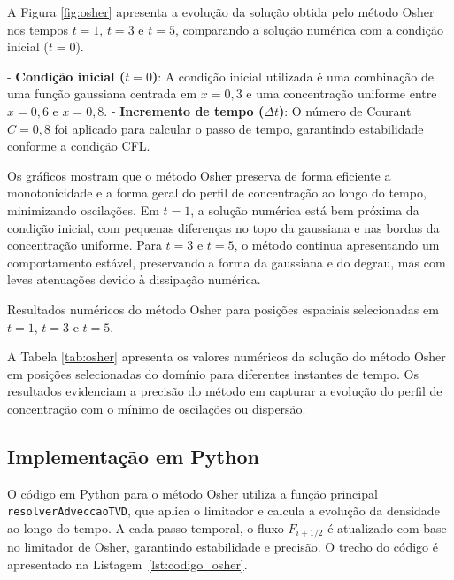 A Figura \ref{fig:osher} apresenta a evolução da solução obtida pelo método Osher nos tempos \(t=1\), \(t=3\) e \(t=5\), comparando a solução numérica com a condição inicial (\(t=0\)).

- \textbf{Condição inicial (\(t=0\))}: A condição inicial utilizada é uma combinação de uma função gaussiana centrada em \(x=0,3\) e uma concentração uniforme entre \(x=0,6\) e \(x=0,8\).
- \textbf{Incremento de tempo (\(\Delta t\))}: O número de Courant \(C=0,8\) foi aplicado para calcular o passo de tempo, garantindo estabilidade conforme a condição CFL.

Os gráficos mostram que o método Osher preserva de forma eficiente a monotonicidade e a forma geral do perfil de concentração ao longo do tempo, minimizando oscilações. Em \(t=1\), a solução numérica está bem próxima da condição inicial, com pequenas diferenças no topo da gaussiana e nas bordas da concentração uniforme. Para \(t=3\) e \(t=5\), o método continua apresentando um comportamento estável, preservando a forma da gaussiana e do degrau, mas com leves atenuações devido à dissipação numérica.

\begin{table}[H]
    \centering
    
    \caption{Resultados numéricos do método Osher para posições espaciais selecionadas em $t=1$, $t=3$ e $t=5$.}
    \label{tab:osher}
\end{table}

A Tabela \ref{tab:osher} apresenta os valores numéricos da solução do método Osher em posições selecionadas do domínio para diferentes instantes de tempo. Os resultados evidenciam a precisão do método em capturar a evolução do perfil de concentração com o mínimo de oscilações ou dispersão.

\subsection{Implementação em Python}

O código em Python para o método Osher utiliza a função principal \texttt{resolverAdveccaoTVD}, que aplica o limitador e calcula a evolução da densidade ao longo do tempo. A cada passo temporal, o fluxo \(F_{i+1/2}\) é atualizado com base no limitador de Osher, garantindo estabilidade e precisão. O trecho do código é apresentado na Listagem~\ref{lst:codigo_osher}.


